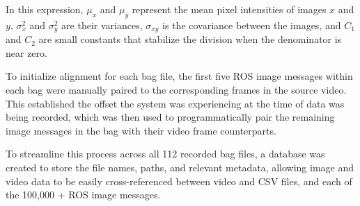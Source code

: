 \documentclass{erauthesis}
\begin{document}
In this expression, $\mu_x$ and $\mu_y$ represent the mean pixel intensities of images $x$ and $y$, $\sigma_x^2$ and $\sigma_y^2$ are their variances, $\sigma_{xy}$ is the covariance between the images, and $C_1$ and $C_2$ are small constants that stabilize the division when the denominator is near zero.

To initialize alignment for each bag file, the first five ROS image messages within each bag were manually paired to the corresponding frames in the source video.
This established the offset the system was experiencing at the time of data was being recorded, which was then used to programmatically pair the remaining image messages in the bag with their video frame counterparts.

To streamline this process across all 112 recorded bag files, a database was created to store the file names, paths, and relevant metadata, allowing image and video data to be easily cross-referenced between video and CSV files, and each of the 100,000 + ROS image messages.





\end{document}
